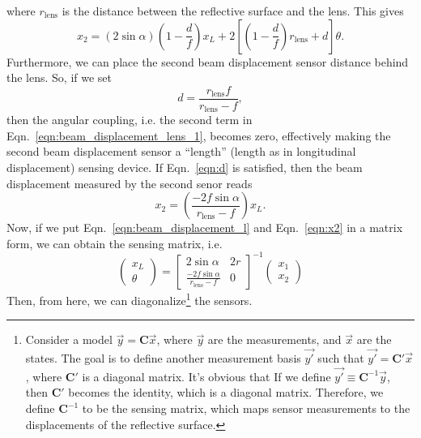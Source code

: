 where $r_\mathrm{lens}$ is the distance between the reflective surface and the lens.
This gives
\begin{equation}
	x_2 = \left(2\sin\alpha\right)\left(1-\frac{d}{f}\right)x_L + 2\left[\left(1-\frac{d}{f}\right)r_\mathrm{lens}+d\right]\theta. 
	\label{eqn:beam_displacement_lens_1}
\end{equation}
Furthermore, we can place the second beam displacement sensor distance behind the lens.
So, if we set
\begin{equation}
	d=\frac{r_\mathrm{lens}f}{r_\mathrm{lens}-f},
	\label{eqn:d}
\end{equation}
then the angular coupling, i.e. the second term in Eqn.~\eqref{eqn:beam_displacement_lens_1}, becomes zero, effectively making the second beam displacement sensor a ``length'' (length as in longitudinal displacement) sensing device.
If Eqn.~\eqref{eqn:d} is satisfied, then the beam displacement measured by the second senor reads
\begin{equation}
	x_2 = \left(\frac{-2f\sin\alpha}{r_\mathrm{lens}-f}\right)x_L.
	\label{eqn:x2}
\end{equation}
Now, if we put Eqn.~\eqref{eqn:beam_displacement_l} and Eqn.~\eqref{eqn:x2} in a matrix form, we can obtain the sensing matrix, i.e.
\begin{equation}
	\begin{pmatrix}
		x_L\\
		\theta
	\end{pmatrix}
	=
	\begin{bmatrix}
		2\sin\alpha & 2r\\
		\frac{-2f\sin\alpha}{r_\mathrm{lens}-f} & 0
	\end{bmatrix}^{-1}
	\begin{pmatrix}
		x_1\\
		x_2
	\end{pmatrix}
\end{equation}
Then, from here, we can diagonalize\footnote{
Consider a model $\vec{y}=\mathbf{C}\vec{x}$, where $\vec{y}$ are the measurements, and $\vec{x}$ are the states.
The goal is to define another measurement basis $\vec{y'}$ such that $\vec{y'}=\mathbf{C'}\vec{x}$, where $\mathbf{C'}$ is a diagonal matrix.
It's obvious that If we define $\vec{y'}\equiv\mathbf{C}^{-1}\vec{y}$, then $\mathbf{C'}$ becomes the identity, which is a diagonal matrix.
Therefore, we define $\mathbf{C}^\mathrm{-1}$ to be the sensing matrix, which maps sensor measurements to the displacements of the reflective surface.
}
the sensors.

